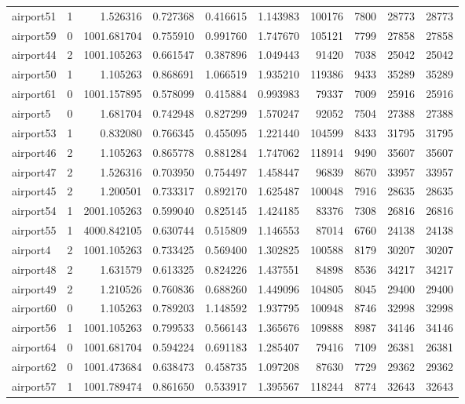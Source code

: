 \begin{longtable}{|l|r|r|r|r|r|r|r|r|r|}
airport51 & 1 & 1.526316 & 0.727368 & 0.416615 & 1.143983 & 100176 & 7800 & 28773 & 28773 \\
airport59 & 0 & 1001.681704 & 0.755910 & 0.991760 & 1.747670 & 105121 & 7799 & 27858 & 27858 \\
airport44 & 2 & 1001.105263 & 0.661547 & 0.387896 & 1.049443 & 91420 & 7038 & 25042 & 25042 \\
airport50 & 1 & 1.105263 & 0.868691 & 1.066519 & 1.935210 & 119386 & 9433 & 35289 & 35289 \\
airport61 & 0 & 1001.157895 & 0.578099 & 0.415884 & 0.993983 & 79337 & 7009 & 25916 & 25916 \\
airport5 & 0 & 1.681704 & 0.742948 & 0.827299 & 1.570247 & 92052 & 7504 & 27388 & 27388 \\
airport53 & 1 & 0.832080 & 0.766345 & 0.455095 & 1.221440 & 104599 & 8433 & 31795 & 31795 \\
airport46 & 2 & 1.105263 & 0.865778 & 0.881284 & 1.747062 & 118914 & 9490 & 35607 & 35607 \\
airport47 & 2 & 1.526316 & 0.703950 & 0.754497 & 1.458447 & 96839 & 8670 & 33957 & 33957 \\
airport45 & 2 & 1.200501 & 0.733317 & 0.892170 & 1.625487 & 100048 & 7916 & 28635 & 28635 \\
airport54 & 1 & 2001.105263 & 0.599040 & 0.825145 & 1.424185 & 83376 & 7308 & 26816 & 26816 \\
airport55 & 1 & 4000.842105 & 0.630744 & 0.515809 & 1.146553 & 87014 & 6760 & 24138 & 24138 \\
airport4 & 2 & 1001.105263 & 0.733425 & 0.569400 & 1.302825 & 100588 & 8179 & 30207 & 30207 \\
airport48 & 2 & 1.631579 & 0.613325 & 0.824226 & 1.437551 & 84898 & 8536 & 34217 & 34217 \\
airport49 & 2 & 1.210526 & 0.760836 & 0.688260 & 1.449096 & 104805 & 8045 & 29400 & 29400 \\
airport60 & 0 & 1.105263 & 0.789203 & 1.148592 & 1.937795 & 100948 & 8746 & 32998 & 32998 \\
airport56 & 1 & 1001.105263 & 0.799533 & 0.566143 & 1.365676 & 109888 & 8987 & 34146 & 34146 \\
airport64 & 0 & 1001.681704 & 0.594224 & 0.691183 & 1.285407 & 79416 & 7109 & 26381 & 26381 \\
airport62 & 0 & 1001.473684 & 0.638473 & 0.458735 & 1.097208 & 87630 & 7729 & 29362 & 29362 \\
airport57 & 1 & 1001.789474 & 0.861650 & 0.533917 & 1.395567 & 118244 & 8774 & 32643 & 32643 \\

\end{longtable}
